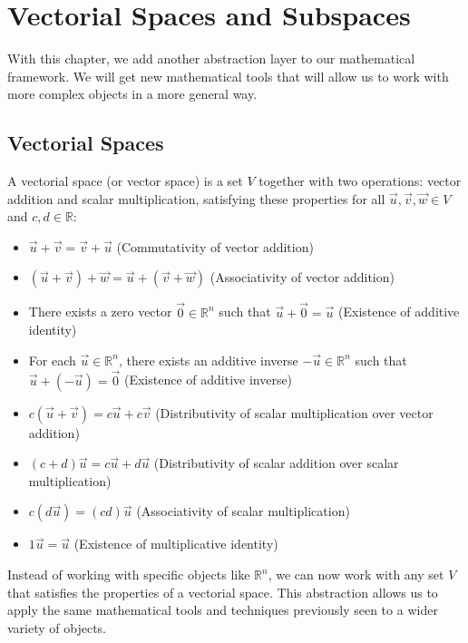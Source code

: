 \chapter{Vectorial Spaces and Subspaces}
With this chapter, we add another abstraction layer to our mathematical framework. We will get new mathematical tools that will allow us to work with more complex objects in a more general way.

\section{Vectorial Spaces}
\begin{definition}
    A vectorial space (or vector space) is a set $V$ together with two operations: vector addition and scalar multiplication, satisfying these properties for all $\vec{u}, \vec{v}, \vec{w} \in V$ and $c,d \in \mathbb{R}$:
    \begin{itemize}[itemsep=1pt,label=$\circ$]
        \item $\vec{u} + \vec{v} = \vec{v} + \vec{u}$ (Commutativity of vector addition)
        \item $(\vec{u} + \vec{v}) + \vec{w} = \vec{u} + (\vec{v} + \vec{w})$ (Associativity of vector addition)
        \item There exists a zero vector $\vec{0} \in \mathbb{R}^n$ such that $\vec{u} + \vec{0} = \vec{u}$ (Existence of additive identity)
        \item For each $\vec{u} \in \mathbb{R}^n$, there exists an additive inverse $-\vec{u} \in \mathbb{R}^n$ such that $\vec{u} + (-\vec{u}) = \vec{0}$ (Existence of additive inverse)
        \item $c(\vec{u} + \vec{v}) = c\vec{u} + c\vec{v}$ (Distributivity of scalar multiplication over vector addition)
        \item $(c + d)\vec{u} = c\vec{u} + d\vec{u}$ (Distributivity of scalar addition over scalar multiplication)
        \item $c(d\vec{u}) = (cd)\vec{u}$ (Associativity of scalar multiplication)
        \item $1\vec{u} = \vec{u}$ (Existence of multiplicative identity)
    \end{itemize}
\end{definition}
Instead of working with specific objects like $\mathbb{R}^n$, we can now work with any set $V$ that satisfies the properties of a vectorial space. This abstraction allows us to apply the same mathematical tools and techniques previously seen to a wider variety of objects.

